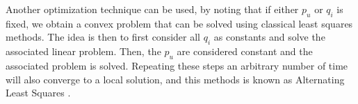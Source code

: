 Another optimization technique can be used, by noting that if either $p_u$ or
$q_i$ is fixed, we obtain a convex problem that can be solved using
classical least squares methods. The idea is then to first consider all $q_i$
as constants and solve the associated linear problem. Then, the $p_u$ are
considered constant and the associated problem is solved. Repeating these steps
an arbitrary number of time will also converge to a local solution, and this
methods is known as Alternating Least Squares \cite{BelKor07}.
